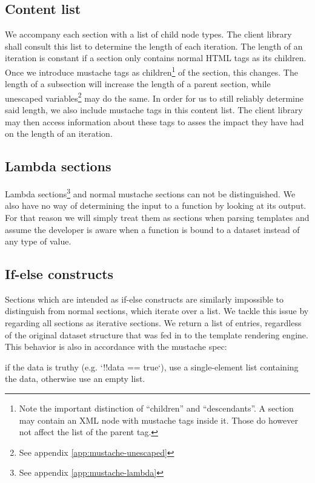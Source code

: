 \documentclass[thesis.tex]{subfiles}
\begin{document}
\subsection{Content list}
\label{sec:content-list}
We accompany each section with a list of child node types. The client library
shall consult this list to determine the length of each iteration.
The length of an iteration is constant if a section only contains normal
HTML tags as its children. Once we introduce mustache tags as
children\footnote{Note the important distinction of ``children'' and
	``descendants''.
	A section may contain an XML node with mustache tags inside it.
	Those do however not affect the  list of the parent tag.
} of the section, this changes.
The length of a subsection will increase the length of a parent section, while
unescaped variables\footnote{See appendix \ref{app:mustache-unescaped}} may do
the same.
In order for us to still reliably determine said length, we also include
mustache tags in this content list. The client library may then access
information about these tags to asses the impact they have had on the length of
an iteration.

\subsection{Lambda sections}
Lambda sections\footnote{See appendix \ref{app:mustache-lambda}}
and normal mustache sections can not be distinguished.
We also have no way of determining the input to a function by looking at its
output. For that reason we will simply treat them as sections when parsing
templates and assume the developer is aware when a function is bound to a
dataset instead of any type of value.

\subsection{If-else constructs}
\label{sec:if-else}
Sections which are intended as if-else constructs are similarly impossible to
distinguish from normal sections, which iterate over a list. We tackle this
issue by regarding all sections as iterative sections. We return a list of
entries, regardless of the original dataset structure that was fed in to the
template rendering engine.
This behavior is also in accordance with the mustache spec:
\begin{citequote}{\cite[sections.yml]{MSTSPEC}}
	if the data is truthy (e.g. `!!data == true`), use a single-element list
	containing the data, otherwise use an empty list.
\end{citequote}
\end{document}
